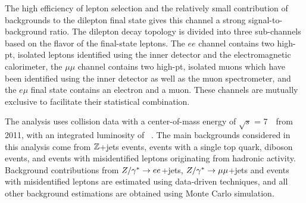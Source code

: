 The high efficiency of lepton selection and the relatively small contribution of backgrounds
to the dilepton final state %
gives this channel a strong signal-to-background ratio.
The dilepton decay topology is divided into three sub-channels based on the flavor of the
final-state leptons.
The $ee$ channel contains two high-pt, isolated leptons identified using 
the inner detector and the electromagnetic calorimeter, the $\mu\mu$ channel contains two
high-pt, isolated muons which have been identified using the inner detector as well as the muon
spectrometer, and the $e \mu$ final state contains an electron and a muon.
These channels are mutually exclusive to facilitate their statistical combination.



The analysis uses collision data with a center-of-mass energy of
$\sqrt{s}$ = 7~\TeV\ from 2011, with an integrated luminosity of \lumitotpm~\cite{Aad:2011dr, ATLAS:2011cia}.
The main backgrounds considered in this analysis come from
$\mathbb{Z}$+jets events, events with a single top quark,
diboson events, and events with misidentified leptons originating from hadronic activity.
Background contributions from
$Z/\gamma^{*} \rightarrow ee$+jets, $Z/\gamma^{*} \rightarrow\mu\mu$+jets and events with
misidentified leptons are estimated using data-driven techniques, and all
other background estimations are obtained using Monte Carlo simulation.


